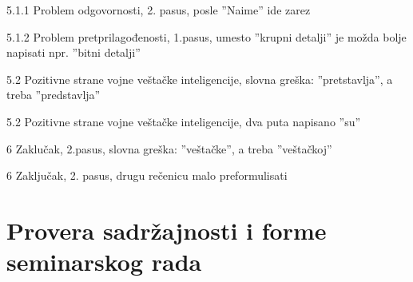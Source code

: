 \documentclass[a4paper]{report}
\begin{document}
5.1.1 Problem odgovornosti, 2. pasus, posle ''Naime'' ide zarez

5.1.2 Problem pretprilagođenosti, 1.pasus, umesto ''krupni detalji'' je možda bolje napisati npr. ''bitni detalji''

5.2 Pozitivne strane vojne veštačke inteligencije, slovna greška: ''pretstavlja'', a treba ''predstavlja''

5.2 Pozitivne strane vojne veštačke inteligencije, dva puta napisano ''su''

6 Zaklučak, 2.pasus, slovna greška: ''veštačke'', a treba ''veštačkoj''

6 Zaključak, 2. pasus, drugu rečenicu malo preformulisati

\section{Provera sadržajnosti i forme seminarskog rada}
\end{document}
